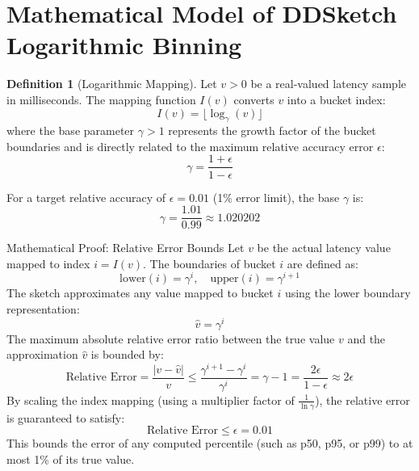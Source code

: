 \documentclass[11pt,a4paper]{article}
\theoremstyle{definition}
\newtheorem{definition}{Definition}[section]
\begin{document}
\section{Mathematical Model of DDSketch Logarithmic Binning}\label{sec:math-model}

\begin{definition}[Logarithmic Mapping]
Let $v > 0$ be a real-valued latency sample in milliseconds. The mapping function $I(v)$ converts $v$ into a bucket index:
\begin{equation}
I(v) = \lfloor \log_{\gamma} (v) \rfloor
\end{equation}
where the base parameter $\gamma > 1$ represents the growth factor of the bucket boundaries and is directly related to the maximum relative accuracy error $\epsilon$:
\begin{equation}
\gamma = \frac{1 + \epsilon}{1 - \epsilon}
\end{equation}
\end{definition}

For a target relative accuracy of $\epsilon = 0.01$ (1\% error limit), the base $\gamma$ is:
\begin{equation}
\gamma = \frac{1.01}{0.99} \approx 1.020202
\end{equation}

\begin{mathbox}{Mathematical Proof: Relative Error Bounds}
Let $v$ be the actual latency value mapped to index $i = I(v)$. The boundaries of bucket $i$ are defined as:
\begin{equation}
\text{lower}(i) = \gamma^i, \quad \text{upper}(i) = \gamma^{i+1}
\end{equation}
The sketch approximates any value mapped to bucket $i$ using the lower boundary representation:
\begin{equation}
\hat{v} = \gamma^i
\end{equation}
The maximum absolute relative error ratio between the true value $v$ and the approximation $\hat{v}$ is bounded by:
\begin{equation}
\text{Relative Error} = \frac{|v - \hat{v}|}{v} \le \frac{\gamma^{i+1} - \gamma^i}{\gamma^i} = \gamma - 1 = \frac{2\epsilon}{1 - \epsilon} \approx 2\epsilon
\end{equation}
By scaling the index mapping (using a multiplier factor of $\frac{1}{\ln \gamma}$), the relative error is guaranteed to satisfy:
\begin{equation}
\text{Relative Error} \le \epsilon = 0.01
\end{equation}
This bounds the error of any computed percentile (such as p50, p95, or p99) to at most 1\% of its true value.
\end{mathbox}
\end{document}
